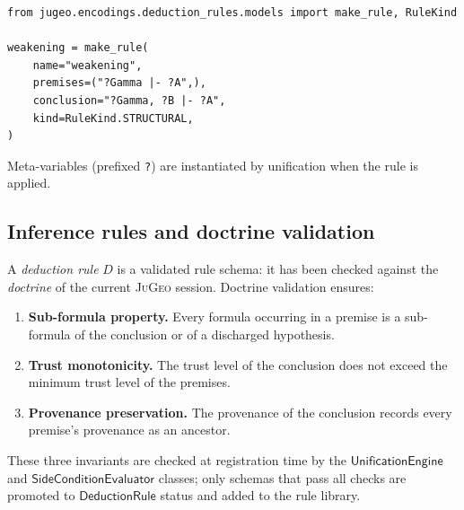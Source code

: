 \documentclass[11pt]{article}
\newcommand{\DR}{\ensuremath{\mathsf{DeductionRule}}}
\newcommand{\JG}{\textsc{JuGeo}}
\begin{document}
\begin{lstlisting}[style=jugeo-python,caption={Repository-backed rule construction.},
  label=lst:ruleschema]
from jugeo.encodings.deduction_rules.models import make_rule, RuleKind

weakening = make_rule(
    name="weakening",
    premises=("?Gamma |- ?A",),
    conclusion="?Gamma, ?B |- ?A",
    kind=RuleKind.STRUCTURAL,
)
\end{lstlisting}

\noindent
Meta-variables (prefixed \texttt{?}) are instantiated by
unification when the rule is applied.

\subsection{Inference rules and doctrine validation}\label{ssec:inference}

A \emph{deduction rule} $D$ is a validated rule schema: it has been
checked against the \emph{doctrine} of the current \JG{} session.
Doctrine validation ensures:
\begin{enumerate}
  \item \textbf{Sub-formula property.}  Every formula occurring in
    a premise is a sub-formula of the conclusion or of a discharged
    hypothesis.
  \item \textbf{Trust monotonicity.}  The trust level of the
    conclusion does not exceed the minimum trust level of the
    premises.
  \item \textbf{Provenance preservation.}  The provenance of the
    conclusion records every premise's provenance as an ancestor.
\end{enumerate}

\noindent
These three invariants are checked at registration time by the
$\mathsf{UnificationEngine}$ and
$\mathsf{SideConditionEvaluator}$ classes; only schemas that pass
all checks are promoted to $\DR$ status and added to the rule
library.
\end{document}

